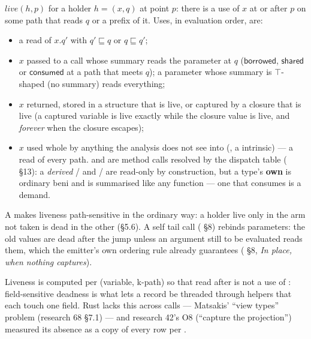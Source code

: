 $\mathit{live}(h,\allowbreak{}p)$ for a holder $h=(x,\allowbreak{}q)$ at point $p$: there is a use of $x$ at or after $p$ on some path that reads $q$ or a prefix of it. Uses, in evaluation order, are:

\begin{itemize}
\item a read of $x.q'$ with $q'\sqsubseteq q$ or $q\sqsubseteq q'$;
\item $x$ passed to a call whose summary reads the parameter at $q$ ($\mathsf{borrowed}$, $\mathsf{shared}$ or $\mathsf{consumed}$ at a path that meets $q$); a parameter whose summary is $\top$-shaped (no summary) reads everything;
\item $x$ returned, stored in a structure that is live, or captured by a closure that is live (a captured variable is live exactly while the closure value is live, and \emph{forever} when the closure escapes);
\item $x$ used whole by anything the analysis does not see into (, a  intrinsic) — a read of every path. \code{==} and \code{<} are method calls resolved by the dispatch table ( §13): a \emph{derived} / and / are read-only by construction, but a type's \textbf{own}  is ordinary beni and is summarised like any function — one that consumes is a demand.
\end{itemize}

A  makes liveness path-sensitive in the ordinary way: a holder live only in the arm not taken is dead in the other (§5.6). A self tail call ( §8) rebinds parameters: the old values are dead after the jump unless an argument still to be evaluated reads them, which the emitter's own ordering rule already guarantees ( §8, \emph{In place, when nothing captures}).

Liveness is computed per (variable, k-path) so that  read after  is not a use of : field-sensitive deadness is what lets a record be threaded through helpers that each touch one field. Rust lacks this across calls — Matsakis' “view types” problem (research 68 §7.1) — and research 42's O8 (“capture the projection”) measured its absence as a copy of every row per .


